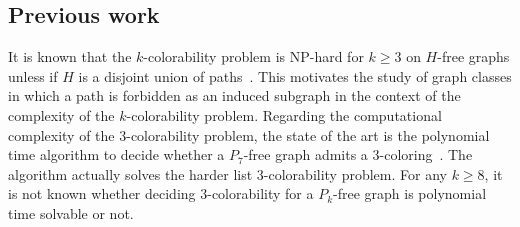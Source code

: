 \documentclass[11pt]{article}
\newcommand{\jg}[1] {
	{\color{blue}{{\tt [JG: }{#1}\tt]}}
}
\begin{document}
%
%
%
%
%


\subsection{Previous work}

It is known that the $k$-colorability problem is NP-hard for $k \geq 3$ on $H$-free graphs unless if $H$ is a disjoint union of paths~\cite{Hol-color,K-L-col-g,K-K-T-W-col-g,L-G-color}.
This motivates the study of graph classes in which a path is forbidden as an induced subgraph in the context of the complexity of the $k$-colorability problem.
Regarding the computational complexity of the 3-colorability problem, the state of the art is the polynomial time algorithm to decide whether a $P_7$-free graph admits a 3-coloring~\cite{BCMSSZ15}. 
The algorithm actually solves the harder list 3-colorability problem.
For any $k\geq 8$, it is not known whether deciding $3$-colorability for a $P_k$-free graph is polynomial time solvable or not.
\end{document}
